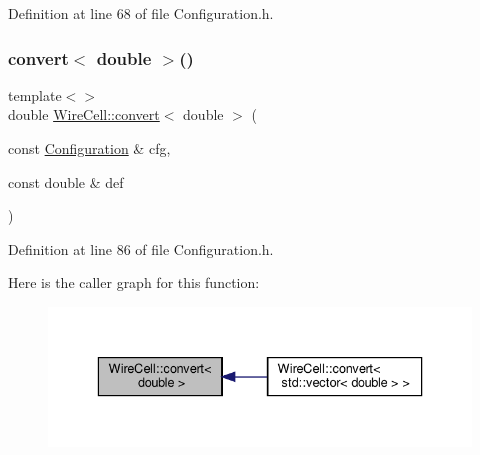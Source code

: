 Definition at line 68 of file Configuration.\+h.

\mbox{\label{namespace_wire_cell_a09f4e09c04881f2ae1c38305dca95d3e}} 
\subsubsection{\texorpdfstring{convert$<$ double $>$()}{convert< double >()}}
{\footnotesize\ttfamily template$<$$>$ \\
double \hyperlink{namespace_wire_cell_a5f6648d6ae801b20a17b8a35fd3306e5}{Wire\+Cell\+::convert}$<$ double $>$ (\begin{DoxyParamCaption}\item[{const \hyperlink{namespace_wire_cell_a9f705541fc1d46c608b3d32c182333ee}{Configuration} \&}]{cfg,  }\item[{const double \&}]{def }\end{DoxyParamCaption})\hspace{0.3cm}{\ttfamily [inline]}}



Definition at line 86 of file Configuration.\+h.

Here is the caller graph for this function\+:
\nopagebreak
\begin{figure}[H]
\begin{center}
\leavevmode
\includegraphics[width=336pt]{namespace_wire_cell_a09f4e09c04881f2ae1c38305dca95d3e_icgraph}
\end{center}
\end{figure}
\mbox{\label{namespace_wire_cell_af4f0d30f38b85de317c7766d8edb3e5b}} 
